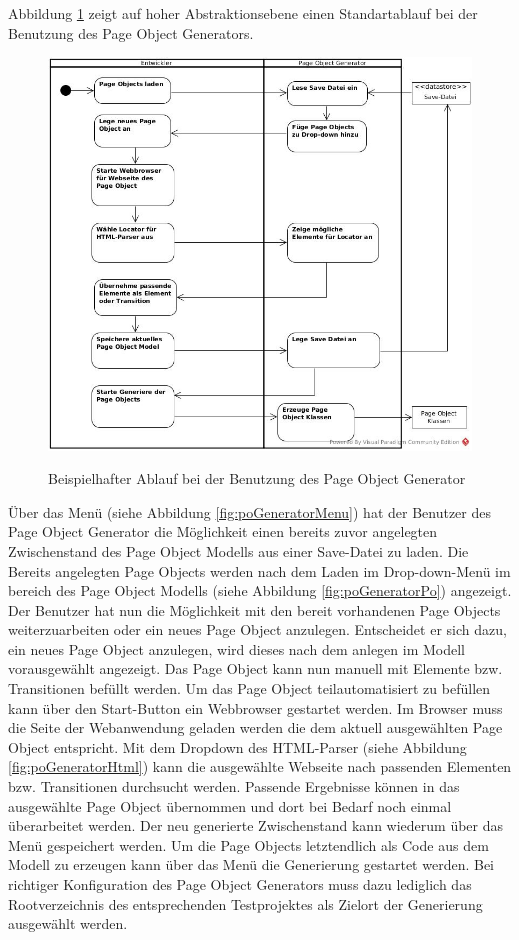 Abbildung \ref{fig:sequenz} zeigt auf hoher Abstraktionsebene einen Standartablauf bei der Benutzung des Page Object Generators.



\begin{figure}[htb]
  \centering  
  \includegraphics[scale=0.45]{img/Activitydiagram.jpg}\\
  \caption{Beispielhafter Ablauf bei der Benutzung des Page Object Generator}
  \label{fig:sequenz}
\end{figure}

Über das Menü (siehe Abbildung \ref{fig:poGeneratorMenu}) hat der Benutzer des Page Object Generator die Möglichkeit einen bereits zuvor angelegten Zwischenstand des Page Object Modells aus einer Save-Datei zu laden. Die Bereits angelegten Page Objects werden nach dem Laden im Drop-down-Menü im bereich des Page Object Modells (siehe Abbildung \ref{fig:poGeneratorPo}) angezeigt. Der Benutzer hat nun die Möglichkeit mit den bereit vorhandenen Page Objects weiterzuarbeiten oder ein neues Page Object anzulegen. Entscheidet er sich dazu, ein neues Page Object anzulegen, wird dieses nach dem anlegen im Modell vorausgewählt angezeigt. Das Page Object kann nun manuell mit Elemente bzw. Transitionen befüllt werden. Um das Page Object teilautomatisiert zu befüllen kann über den Start-Button ein Webbrowser gestartet werden. Im Browser muss die Seite der Webanwendung geladen werden die dem aktuell ausgewählten Page Object entspricht. Mit dem Dropdown des HTML-Parser (siehe Abbildung \ref{fig:poGeneratorHtml}) kann die ausgewählte Webseite nach passenden Elementen bzw. Transitionen durchsucht werden.
Passende Ergebnisse können in das ausgewählte Page Object übernommen und dort bei Bedarf noch einmal überarbeitet werden.
Der neu generierte Zwischenstand kann wiederum über das Menü gespeichert werden.
Um die Page Objects letztendlich als Code aus dem Modell zu erzeugen kann über das Menü die Generierung gestartet werden. Bei richtiger Konfiguration des Page Object Generators muss dazu lediglich das Rootverzeichnis des entsprechenden Testprojektes als Zielort der Generierung ausgewählt werden.


